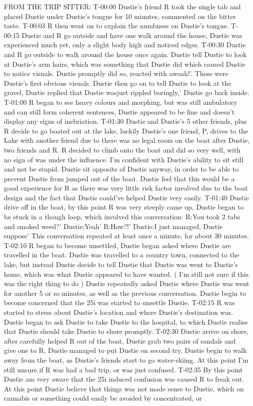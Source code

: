 \documentclass[12pt]{book}
\begin{document}
FROM THE TRIP SITTER: T-00:00 Dustie's friend R took the single tab and placed Dustie under Dustie's tongue for 10 minutes, commented on the bitter taste. T-00:03 R then went on to explain the numbness on Dustie's tongue. T-00:15 Dustie and R go outside and have one walk around the house, Dustie was experienced much yet, only a slight body high and noticed edges. T-00:30 Dustie and R go outside to walk around the house once again. Dustie tell Dustie to look at Dustie's arm hairs, which was something that Dustie did which caused Dustie to notice visuals. Dustie promptly did so, reacted with awoah!'. These were Dustie's first obvious visuals. Dustie then go on to tell Dustie to look at the gravel, Dustie replied that Dustie wasjust rippled boringly,' Dustie go back inside. T-01:00 R began to see heavy colours and morphing, but was still ambulatory and can still form coherent sentences, Dustie appeared to be fine and doesn't display any signs of inebriation. T-01:30 Dustie and Dustie's 5 other friends, plus R decide to go boated out at the lake, luckily Dustie's one friend, P, drives to the Lake with another friend due to there was no legal room on the boat after Dustie, two friends and R. R decided to climb onto the boat and did so very well, with no sign of was under the influence. I'm confident with Dustie's ability to sit still and not be stupid. Dustie sit opposite of Dustie anyway, in order to be able to prevent Dustie from jumped out of the boat. Dustie feel that this would be a good experience for R as there was very little risk factor involved due to the boat design and the fact that Dustie could've helped Dustie very easily. T-01:40 Dustie drive off in the boat, by this point R was very steeply came up, Dustie began to be stuck in a though loop, which involved this conversation: R:You took 2 tabs and smoked weed?' Dustie:Yeah' R:How?!' Dustie:I just managed, Dustie suppose' This conversation repeated at least once a minute, for about 30 minutes. T-02:10 R began to become unsettled, Dustie began asked where Dustie are travelled in the boat. Dustie was travelled to a country town, connected to the lake, but instead Dustie decide to tell Dustie that Dustie was went to Dustie's home, which was what Dustie appeared to have wanted. ( I'm still not sure if this was the right thing to do ) Dustie repeatedly asked Dustie where Dustie was went for another 5 or so minutes, as well as the previous conversation. Dustie begin to become concerned that the 25i was started to unsettle Dustie. T-02:15 R was started to stress about Dustie's location and where Dustie's destination was. Dustie began to ask Dustie to take Dustie to the hospital, to which Dustie realise that Dustie should take Dustie to shore promptly. T-02:30 Dustie arrive on shore, after carefully helped R out of the boat, Dustie grab two pairs of sandals and give one to R, Dustie managed to put Dustie on second try. Dustie begin to walk away from the boat, as Dustie's friends start to go water-skiing. At this point I'm still unsure if R was had a bad trip, or was just confused. T-02:35 By this point Dustie am very aware that the 25i induced confusion was caused R to freak out. At this point Dustie believe that things was not made sense to Dustie, which on cannabis or something could easily be avoided by concentrated, or 
\end{document}
